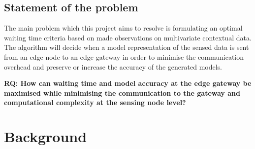 \documentclass{mpaper}
\begin{document}
\subsection*{Statement of the problem}
The main problem which this project aims to resolve is formulating an optimal waiting time criteria based on made observations on multivariate contextual data. The algorithm will decide when a model representation of the sensed data is sent from an edge node to an edge gateway in order to minimise the communication overhead and preserve or increase the accuracy of the generated models.


\textbf{RQ: How can waiting time and model accuracy at the edge gateway be maximised while minimising the communication to the gateway and computational complexity at the sensing node level?}

\section{Background}
\end{document}
